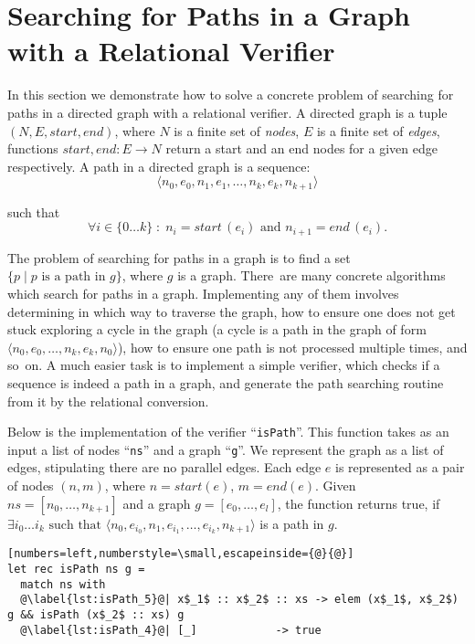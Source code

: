 \section{Searching for Paths in a Graph with a Relational Verifier}
\label{sec:example}

In this section we demonstrate how to solve a concrete problem of searching for paths in a directed graph with a relational verifier. 
A directed graph is a tuple $(N, E, start, end)$, where $N$ is a finite set of \emph{nodes}, $E$ is a finite set of \emph{edges}, functions $start, end : E \rightarrow N$ return a start and an end nodes for a given edge respectively.
A path in a directed graph is a sequence:
\[
\langle n_0, e_0, n_1, e_1, \dots, n_k, e_k, n_{k+1} \rangle
\]

such that 
\[
\forall i \in \{ 0 \dots k \}\; :\; n_i = start\,(e_i) \text{ and } n_{i+1} = end\,(e_i).
\]

The problem of searching for paths in a graph is to find a set $\{ p \mid p \text{ is a path in } g\}$, where $g$ is a graph. 
There~are many concrete algorithms which search for paths in a graph. 
Implementing any of them involves determining in which way to traverse the graph, how to ensure one does not get stuck exploring a cycle in the graph (a cycle is a path in the graph of form $\langle n_0, e_0, \dots, n_k, e_k, n_0 \rangle$), how to ensure one path is not processed multiple times, and so~on. 
A much easier task is to implement a simple verifier, which checks if a sequence is indeed a path in a graph, and generate the path searching routine from it by the relational conversion.

Below is the implementation of the verifier ``\lstinline{isPath}''. 
This function takes as an input a list of nodes ``\lstinline{ns}'' and a graph ``\lstinline{g}''. 
We represent the graph as a list of edges, stipulating there are no parallel edges. 
Each edge $e$ is represented as a pair of nodes $(n, m)$, where $n = start(e)$, $m = end(e)$.
Given $ns = [n_0, \dots, n_{k+1}]$ and a graph $g = [e_0, \dots, e_l]$, the function returns true, if $\exists i_0 \dots i_k \text{ such that } \langle n_0, e_{i_0}, n_1, e_{i_1}, \dots, e_{i_k}, n_{k+1} \rangle$ is a path in $g$.

\begin{lstlisting}[numbers=left,numberstyle=\small,escapeinside={@}{@}]
let rec isPath ns g =
  match ns with
  @\label{lst:isPath_5}@| x$_1$ :: x$_2$ :: xs -> elem (x$_1$, x$_2$) g && isPath (x$_2$ :: xs) g 
  @\label{lst:isPath_4}@| [_]            -> true
\end{lstlisting}

